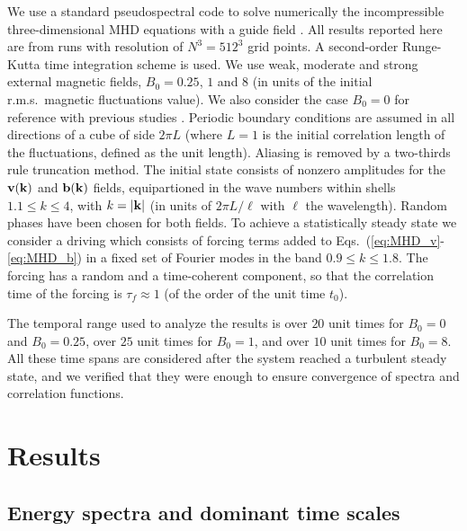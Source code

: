 \documentclass[aip,pop,reprint,amsmath,amssymb,floatfix]{revtex4-1}
\begin{document}
We use a standard pseudospectral code to solve numerically the
incompressible three-dimensional MHD equations with a guide field
\cite{gomez_parallel_2005, gomez_mhd_2005}. All results reported here
are from runs with resolution of $N^3 = 512^3$ grid points. A
second-order Runge-Kutta time integration scheme is used. We use weak,
moderate and strong external magnetic fields, $B_0 = 0.25$, $1$ and
$8$ (in units of the initial r.m.s.~magnetic fluctuations value). We
also consider the case $B_0 = 0$ for reference with previous studies
\cite{servidio_time_2011}. Periodic boundary conditions are assumed in
all directions of a cube of side $2\pi L$ (where $L = 1$ is the
initial correlation length of the fluctuations, defined as the unit
length). Aliasing is removed by a two-thirds rule truncation
method. The initial state consists of nonzero amplitudes for the ${\bf
  v}({\bf k})$ and ${\bf b}({\bf k})$ fields, equipartioned in the
wave numbers within shells $1.1\leq k \leq 4$, with $k=|{\bf k}|$ (in
units of $2\pi L/\ell$ with $\ell$ the wavelength). Random phases have
been chosen for both fields. To achieve a statistically steady state
we consider a driving which consists of forcing terms added to
Eqs.~(\ref{eq:MHD_v}-\ref{eq:MHD_b}) in a fixed set of Fourier modes
in the band $0.9\leq k \leq 1.8$. The forcing has a random and a
time-coherent component, so that the correlation time of the forcing
is $\tau_f \approx 1$ (of the order of the unit time $t_0$).

The temporal range used to analyze the results is over $20$ unit times
for $B_0=0$ and $B_0=0.25$, over $25$ unit times for $B_0=1$, and over
$10$ unit times for $B_0=8$. All these time spans are considered after
the system reached a turbulent steady state, and we verified that they
were enough to ensure convergence of spectra and correlation
functions.


\section{Results}\label{sec_Res}

\subsection{Energy spectra and dominant time scales}
\end{document}
